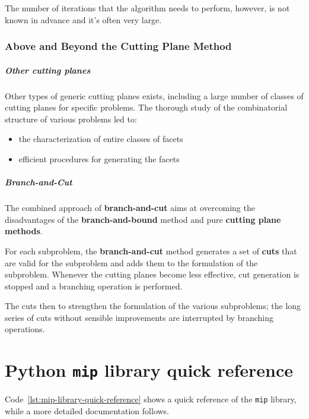 \documentclass[english]{article}
\begin{document}
The number of iterations that the algorithm needs to perform, however, is not known in advance and it's often very large.

\subsubsection{Above and Beyond the Cutting Plane Method}
\subparagraph*{Other cutting planes}

Other types of generic cutting planes exists, including a large number of classes of cutting planes for specific problems.
The thorough study of the combinatorial structure of various problems led to:

\begin{itemize}
  \item the characterization of entire classes of facets
  \item efficient procedures for generating the facets
\end{itemize}

\subparagraph*{Branch-and-Cut}
The combined approach of \textbf{branch-and-cut} aims at overcoming the disadvantages of the \textbf{branch-and-bound} method and pure \textbf{cutting plane methods}.

For each subproblem, the \textbf{branch-and-cut} method generates a set of \textbf{cuts} that are valid for the subproblem and adds them to the formulation of the subproblem.
Whenever the cutting planes become less effective, cut generation is stopped and a branching operation is performed.

The cuts then to strengthen the formulation of the various subproblems; the long series of cuts without sensible improvements are interrupted by branching operations.

\clearpage

\section{Python \texttt{mip} library quick reference}

Code~\ref{lst:mip-library-quick-reference} shows a quick reference of the \texttt{mip} library, while a more detailed documentation follows.
\end{document}
